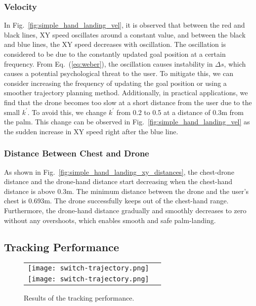 \subsubsection{Velocity}
In Fig.~\ref{fig:simple_hand_landing_vel},
it is observed that between the red and black lines, XY speed oscillates around a constant value, and between the black and blue lines, the XY speed decreases with oscillation.
The oscillation is considered to be due to the constantly updated goal position at a certain frequency.
From Eq.~(\ref{eq:weber}), the oscillation causes instability in $\Delta s$,
which causes a potential psychological threat to the user.
To mitigate this, we can consider increasing the frequency of updating the goal position or using a smoother trajectory planning method.
Additionally, in practical applications, we find that the drone becomes too slow at a short distance from the user due to the small $k^\prime$.
To avoid this, we change $k^\prime$ from 0.2 to 0.5 at a distance of 0.3m from the palm.
This change can be observed in Fig.~\ref{fig:simple_hand_landing_vel} as the sudden increase in XY speed right after the blue line.

\subsubsection{Distance Between Chest and Drone}
As shown in Fig.~\ref{fig:simple_hand_landing_xy_distances}, the chest-drone distance and the drone-hand distance start decreasing 
when the chest-hand distance is above 0.3m.
The minimum distance between the drone and the user's chest is 0.693m.
The drone successfully keeps out of the chest-hand range.
Furthermore, the drone-hand distance gradually and smoothly decreases to zero without any overshoots,
which enables smooth and safe palm-landing.

\subsection{Tracking Performance}
\begin{figure}
  \centering
  \begin{tabular}{cc}
      \begin{minipage}[t]{\columnwidth}
        \centering
        \texttt{[image: switch-trajectory.png]}
        \subcaption{}
        \label{fig:tracking}
      \end{minipage}\\
      \begin{minipage}[t]{\columnwidth}
        \centering
        \texttt{[image: switch-trajectory.png]}
        \subcaption{}
        \label{fig:tracking_vel}
      \end{minipage} 
    \end{tabular}
  \caption{Results of the tracking performance.}
\end{figure}